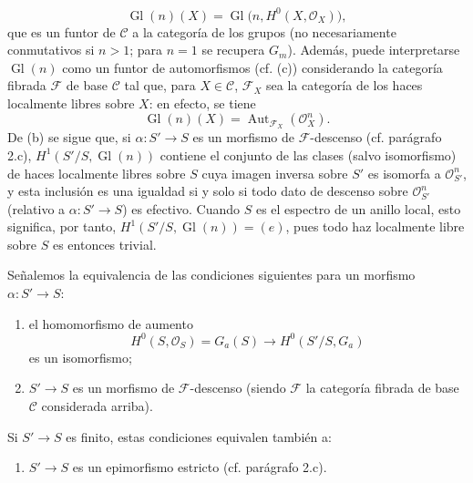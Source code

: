\documentclass[11pt,twoside,openany]{book}
\numberwithin{equation}{section}
\newcommand{\src}[1]{%
  \phantomsection\hypertarget{src:#1}{}%
  \marginpar{\raggedleft\footnotesize\sffamily #1}%
}
\theoremstyle{plain}
\theoremstyle{definition}
\theoremstyle{remark}
\newcommand{\FgaUnitKey}{frontmatter}
\renewcommand{\src}[1]{%
  \phantomsection\hypertarget{src:\FgaUnitKey:#1}{}%
  \marginpar{\raggedleft\footnotesize\sffamily #1}%
}
\theoremstyle{plain}
\theoremstyle{definition}
\theoremstyle{remark}
\begin{document}
\src{313}
\[
  \operatorname{Gl}(n)(X)=
  \operatorname{Gl}\bigl(n,H^0(X,\mathcal O_X)\bigr),
\]
que es un funtor de $\mathcal C$ a la categoría de los grupos (no
necesariamente conmutativos si $n>1$; para $n=1$ se recupera $G_m$). Además,
puede interpretarse $\operatorname{Gl}(n)$ como un funtor de automorfismos
(cf. (c)) considerando la categoría fibrada $\mathcal F$ de base $\mathcal C$
tal que, para $X\in\mathcal C$, $\mathcal F_X$ sea la categoría de los haces
localmente libres sobre $X$: en efecto, se tiene
\[
  \operatorname{Gl}(n)(X)=
  \operatorname{Aut}_{\mathcal F_X}(\mathcal O_X^n).
\]
De (b) se sigue que, si $\alpha:S'\longrightarrow S$ es un morfismo de
$\mathcal F$-descenso (cf. parágrafo 2.c),
$H^1(S'/S,\operatorname{Gl}(n))$ contiene el conjunto de las clases (salvo
isomorfismo) de haces localmente libres sobre $S$ cuya imagen inversa sobre
$S'$ es isomorfa a $\mathcal O_{S'}^n$, y esta inclusión es una igualdad si y
solo si todo dato de descenso sobre $\mathcal O_{S'}^n$ (relativo a
$\alpha:S'\longrightarrow S$) es efectivo. Cuando $S$ es el espectro de un
anillo local, esto significa, por tanto,
$H^1(S'/S,\operatorname{Gl}(n))=(e)$, pues todo haz localmente libre sobre $S$
es entonces trivial.

Señalemos la equivalencia de las condiciones siguientes para un morfismo
$\alpha:S'\longrightarrow S$:
\begin{enumerate}
\item[(i)] el homomorfismo de aumento
\[
  H^0(S,\mathcal O_S)=G_a(S)\longrightarrow H^0(S'/S,G_a)
\]
es un isomorfismo;
\item[(ii)] $S'\longrightarrow S$ es un morfismo de $\mathcal F$-descenso
(siendo $\mathcal F$ la categoría fibrada de base $\mathcal C$ considerada
arriba).
\end{enumerate}
Si $S'\longrightarrow S$ es finito, estas condiciones equivalen también a:
\begin{enumerate}
\item[(iii)] $S'\longrightarrow S$ es un epimorfismo estricto
(cf. parágrafo 2.c).
\end{enumerate}
\end{document}
